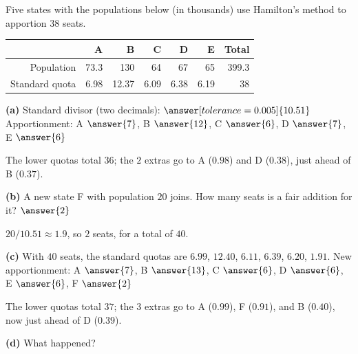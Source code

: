 \documentclass[12pt]{ximera}
\begin{document}
\begin{problem}
Five states with the populations below (in thousands) use Hamilton's method to apportion
$38$ seats.
\begin{center}
\begin{tabular}{r|rrrrrr}
 & A & B & C & D & E & Total\\\hline
Population & 73.3 & 130 & 64 & 67 & 65 & 399.3\\
Standard quota & 6.98 & 12.37 & 6.09 & 6.38 & 6.19 & 38
\end{tabular}
\end{center}

\begin{prompt}
\textbf{(a)} Standard divisor (two decimals): $\answer[tolerance=0.005]{10.51}$ \qquad
Apportionment: A $\answer{7}$, B $\answer{12}$, C $\answer{6}$, D $\answer{7}$,
E $\answer{6}$
\begin{feedback}
The lower quotas total $36$; the $2$ extras go to A ($0.98$) and D ($0.38$), just ahead of
B ($0.37$).
\end{feedback}
\end{prompt}

\begin{prompt}
\textbf{(b)} A new state F with population $20$ joins. How many seats is a fair addition
for it? $\answer{2}$
\begin{feedback}
$20/10.51\approx1.9$, so $2$ seats, for a total of $40$.
\end{feedback}
\end{prompt}

\begin{prompt}
\textbf{(c)} With $40$ seats, the standard quotas are $6.99$, $12.40$, $6.11$, $6.39$,
$6.20$, $1.91$. New apportionment: A $\answer{7}$, B $\answer{13}$, C $\answer{6}$,
D $\answer{6}$, E $\answer{6}$, F $\answer{2}$
\begin{feedback}
The lower quotas total $37$; the $3$ extras go to A ($0.99$), F ($0.91$), and B ($0.40$),
now just ahead of D ($0.39$).
\end{feedback}
\end{prompt}

\begin{prompt}
\textbf{(d)} What happened?
\begin{multipleChoice}
\end{multipleChoice}
\end{prompt}
\end{problem}
\end{document}
